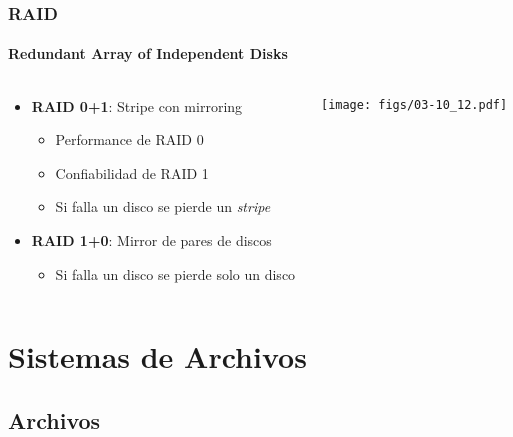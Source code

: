 \documentclass[letter]{beamer}
\begin{document}
\begin{frame}
  \frametitle{RAID}
  \framesubtitle{Redundant Array of Independent Disks}

  \begin{columns}[c]
    \begin{column}[T]{7cm}
      \begin{itemize}
        \item {\bf RAID 0+1}: Stripe con mirroring
          \begin{itemize}
            \item Performance de RAID 0
            \item Confiabilidad de RAID 1
            \item Si falla un disco se pierde un {\em stripe}
          \end{itemize}
        \item {\bf RAID 1+0}: Mirror de pares de discos
          \begin{itemize}
            \item Si falla un disco se pierde solo un disco
          \end{itemize}
      \end{itemize}
    \end{column}
    \begin{column}[T]{5cm}
      \begin{center}
        \texttt{[image: figs/03-10\_12.pdf]}
      \end{center}
    \end{column}
  \end{columns}

\end{frame}

\section{Sistemas de Archivos}

\subsection{Archivos}
\end{document}
